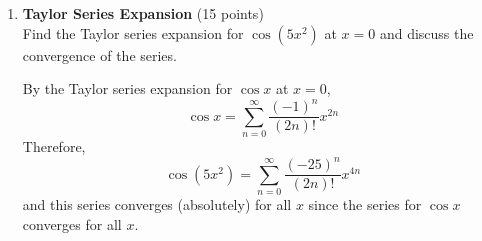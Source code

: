 \begin{enumerate}
  \item \textbf{Taylor Series Expansion} (15 points)\\
  Find the Taylor series expansion for \(\cos(5x^2)\) at \(x = 0\) and discuss the convergence of the series.
  \begin{subanswer}[red]
    By the Taylor series expansion for \(\cos x\) at \(x = 0\),
    $$
    \cos x=\sum_{n=0}^{\infty} \frac{(-1)^n}{(2 n)!} x^{2 n}
    $$
    Therefore,
    $$
    \cos \left(5 x^2\right)=\sum_{n=0}^{\infty} \frac{(-25)^n}{(2 n)!} x^{4 n}
    $$
    and this series converges (absolutely) for all $x$ since the series for $\cos x$ converges for all $x$.
  \end{subanswer}
\end{enumerate}

